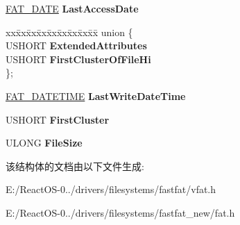 \begin{DoxyCompactItemize}
\hyperlink{struct___f_a_t___d_a_t_e}{F\+A\+T\+\_\+\+D\+A\+TE} {\bfseries Last\+Access\+Date}
\item 
\mbox{\label{union___d_i_r___e_n_t_r_y_accbea08acf934d940479634b92e3dcd7}} 
\begin{tabbing}
xx\=xx\=xx\=xx\=xx\=xx\=xx\=xx\=xx\=\kill
union \{\\
\>USHORT {\bfseries ExtendedAttributes}\\
\>USHORT {\bfseries FirstClusterOfFileHi}\\
\}; \\

\end{tabbing}\item 
\mbox{\label{union___d_i_r___e_n_t_r_y_aafbaef14284b6639e5c8504939eaccfe}} 
\hyperlink{struct___f_a_t___d_a_t_e_t_i_m_e}{F\+A\+T\+\_\+\+D\+A\+T\+E\+T\+I\+ME} {\bfseries Last\+Write\+Date\+Time}
\item 
\mbox{\label{union___d_i_r___e_n_t_r_y_a83cf8de664c75ce5d19ec9a98619d3fb}} 
U\+S\+H\+O\+RT {\bfseries First\+Cluster}
\item 
\mbox{\label{union___d_i_r___e_n_t_r_y_a3c6036bb6580819ef501005493d957b4}} 
U\+L\+O\+NG {\bfseries File\+Size}
\end{DoxyCompactItemize}


该结构体的文档由以下文件生成\+:\begin{DoxyCompactItemize}
\item 
E\+:/\+React\+O\+S-\/0../drivers/filesystems/fastfat/vfat.\+h\item 
E\+:/\+React\+O\+S-\/0../drivers/filesystems/fastfat\+\_\+new/fat.\+h\end{DoxyCompactItemize}
